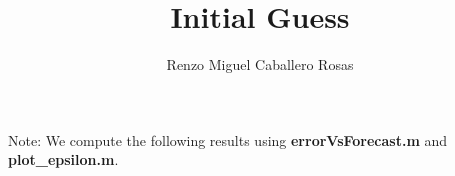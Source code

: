 \documentclass[aspectratio=169]{beamer}\usepackage[utf8]{inputenc}
\title{Initial Guess}
\subtitle{Renzo Miguel Caballero Rosas}
\begin{document}
\begin{frame}
\titlepage
{\tiny Note: We compute the following results using \textbf{errorVsForecast.m} and \textbf{plot\_epsilon.m}.}
\end{frame}


%
%
%
%
%
\end{document}
